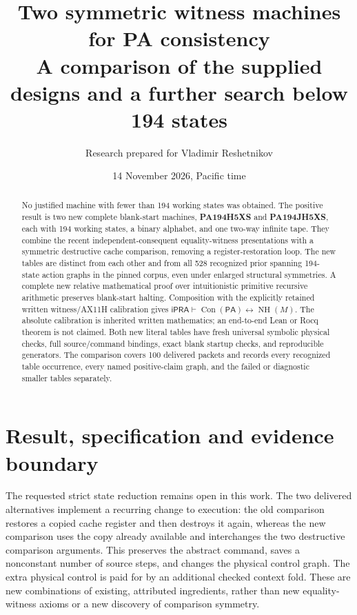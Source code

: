 \documentclass[10pt,letterpaper]{article}
\title{Two symmetric witness machines for PA consistency\\[5pt]
\large A comparison of the supplied designs and a further search below 194 states}
\author{Research prepared for Vladimir Reshetnikov}
\date{14 November 2026, Pacific time}
\newcommand{\ipra}{\mathsf{iPRA}}
\newcommand{\PA}{\mathsf{PA}}
\newcommand{\Con}{\operatorname{Con}}
\newcommand{\NH}{\operatorname{NH}}
\begin{document}
\maketitle
\begin{abstract}
No justified machine with fewer than 194 working states was obtained.
The positive result is two new complete blank-start machines,
\textbf{PA194H5XS} and \textbf{PA194JH5XS}, each with 194 working states,
a binary alphabet, and one two-way infinite tape.  They combine the
recent independent-consequent equality-witness presentations with a
symmetric destructive cache comparison, removing a register-restoration
loop.  The new tables are distinct from each other and from all 528
recognized prior spanning 194-state action graphs in the pinned corpus,
even under enlarged structural symmetries.  A complete new relative
mathematical proof over intuitionistic primitive recursive arithmetic
preserves blank-start halting.  Composition with the explicitly retained
written witness/AX11H calibration gives
\(\ipra\vdash\Con(\PA)\leftrightarrow\NH(M)\).
The absolute calibration is inherited written mathematics; an
end-to-end Lean or Rocq theorem is not claimed.  Both new literal tables
have fresh universal symbolic physical checks, full source/command
bindings, exact blank startup checks, and reproducible generators.
The comparison covers 100 delivered packets and records every recognized
table occurrence, every named positive-claim graph, and the failed or
diagnostic smaller tables separately.
\end{abstract}
\setcounter{tocdepth}{1}
\tableofcontents
\newpage

\section{Result, specification and evidence boundary}

The requested strict state reduction remains open in this work.  The
two delivered alternatives implement a recurring change to execution:
the old comparison restores a copied cache register and then destroys it
again, whereas the new comparison uses the copy already available and
interchanges the two destructive comparison arguments.  This preserves
the abstract command, saves a nonconstant number of source steps, and
changes the physical control graph.  The extra physical control is paid
for by an additional checked context fold.  These are new combinations
of existing, attributed ingredients, rather than new equality-witness
axioms or a new discovery of comparison symmetry.
\end{document}
